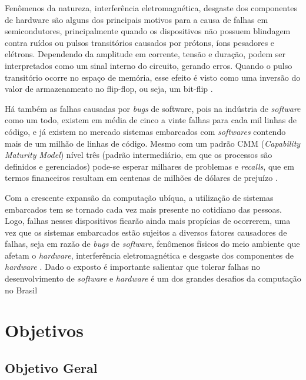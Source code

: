 Fenômenos da natureza, interferência eletromagnética, desgaste dos componentes de hardware \cite{Hsueh:1997} são alguns dos principais motivos para a causa de falhas em semicondutores, principalmente quando os dispositivos não possuem blindagem contra ruídos ou pulsos transitórios causados por prótons, íons pesadores e elétrons. Dependendo da amplitude em corrente, tensão e duração, podem ser interpretados como um sinal interno do circuito, gerando erros. Quando o pulso transitório ocorre no espaço de memória, esse efeito é visto como uma inversão do valor de armazenamento no flip-flop, ou seja, um bit-flip \cite{Ziegler:1996}. 

Há também as falhas causadas por \textit{bugs} de software, pois na indústria de \textit{software} como um todo, existem em média de cinco a vinte falhas para cada mil linhas de código, e já existem no mercado sistemas embarcados com \textit{softwares} contendo mais de um milhão de linhas de código. Mesmo com um padrão CMM (\textit {Capability Maturity Model}) nível três (padrão intermediário, em que os processos são definidos e gerenciados) \cite{Pressman:2005} pode-se esperar milhares de problemas e \textit{recalls}, que em termos financeiros resultam em centenas de milhões de dólares de prejuízo \cite{Taurion:2005}.

Com a crescente expansão da computação ubíqua, a utilização de sistemas embarcados tem se tornado cada vez mais presente no cotidiano das pessoas. Logo, falhas nesses dispositivos ficarão ainda mais propícias de ocorrerem, uma vez que os sistemas embarcados estão sujeitos a diversos fatores causadores de falhas, seja em razão de \textit{bugs} de \textit{software}, fenômenos físicos do meio ambiente que afetam o \textit{hardware}, interferência eletromagnética e desgaste dos componentes de \textit{hardware} \cite{Kruger:2014}. Dado o exposto é importante salientar que tolerar falhas no desenvolvimento de \textit{software} e \textit{hardware} é um dos grandes desafios da computação no Brasil \cite{Carvalho:2006}


\section{Objetivos} \label{Sec:Objetivos}

\subsection{Objetivo Geral} \label{Sec:ObjetivoGeral}

